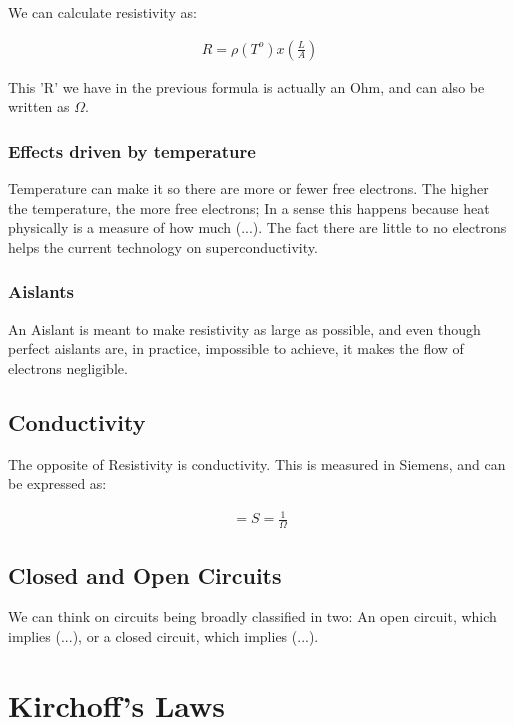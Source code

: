 \documentclass[11pt,fleqn]{book} %
\begin{document}
We can calculate resistivity as:

\begin{gather}
    R = \rho(T^o) x (\frac{L}{A})
\end{gather}

This 'R' we have in the previous formula is actually an Ohm, and can also be written as $\Omega$.

\subsection{Effects driven by temperature}

Temperature can make it so there are more or fewer free electrons. The higher the temperature, the more free electrons;
In a sense this happens because heat physically is a measure of how much (...). The fact there are little to no electrons helps 
the current technology on superconductivity.   

\subsection{Aislants}

An Aislant is meant to make resistivity as large as possible, and even though perfect aislants are, in practice, impossible to achieve,
it makes the flow of electrons negligible. 

\section{Conductivity}

The opposite of Resistivity is conductivity. This is measured in Siemens, and can be expressed as:

\begin{gather}
    [G] = S = \frac{1}{\Omega}
\end{gather}

\section{Closed and Open Circuits}

We can think on circuits being broadly classified in two: An open circuit, which implies (...), or a closed circuit, which
implies (...).

\chapter{Kirchoff's Laws}
\end{document}
